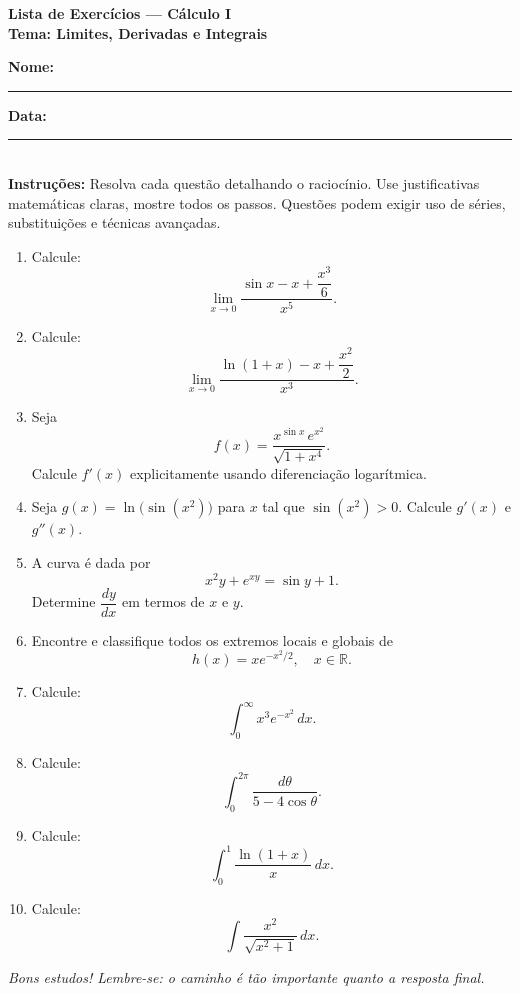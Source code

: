 \documentclass[12pt,a4paper]{article}
\begin{document}
	
	\begin{center}
		\textbf{\LARGE Lista de Exercícios — Cálculo I} \\[0.5cm]
		\textbf{Tema: Limites, Derivadas e Integrais} \\[1cm]
	\end{center}
	
	\noindent
	\textbf{Nome:} \rule{10cm}{0.4pt} \hfill
	
	\noindent
	\textbf{Data:} \rule{4cm}{0.4pt} \\[0.4cm]
	
	\noindent
	\textbf{Instruções:} Resolva cada questão detalhando o raciocínio.  
	Use justificativas matemáticas claras, mostre todos os passos.  
	Questões podem exigir uso de séries, substituições e técnicas avançadas.  
	
	\vspace{0.8cm}
	
	\begin{enumerate}[leftmargin=0.8cm,label=\textbf{Questão \arabic*},itemsep=1.6cm]
		
		\item Calcule:
		\[
		\lim_{x\to 0}\frac{\sin x - x + \dfrac{x^3}{6}}{x^5}.
		\]
		
		\item Calcule:
		\[
		\lim_{x\to 0}\frac{\ln(1+x) - x + \dfrac{x^2}{2}}{x^3}.
		\]
		
		\item Seja
		\[
		f(x)=\frac{x^{\sin x}\,e^{x^2}}{\sqrt{1+x^4}}.
		\]
		Calcule \(f'(x)\) explicitamente usando diferenciação logarítmica.
		
		\item Seja \(g(x)=\ln\big(\sin(x^2)\big)\) para \(x\) tal que \(\sin(x^2)>0\).  
		Calcule \(g'(x)\) e \(g''(x)\).
		
		\item A curva é dada por
		\[
		x^2 y + e^{xy} = \sin y + 1.
		\]
		Determine \(\dfrac{dy}{dx}\) em termos de \(x\) e \(y\).
		
		\item Encontre e classifique todos os extremos locais e globais de
		\[
		h(x)=x e^{-x^2/2},\quad x\in\mathbb{R}.
		\]
		
		\item Calcule:
		\[
		\int_{0}^{\infty} x^3 e^{-x^2}\,dx.
		\]
		
		\item Calcule:
		\[
		\int_{0}^{2\pi}\frac{d\theta}{5-4\cos\theta}.
		\]
		
		
		\item Calcule:
		\[
		\int_{0}^{1}\frac{\ln(1+x)}{x}\,dx.
		\]
		
		
		\item Calcule:
		\[
		\int \frac{x^2}{\sqrt{x^2+1}}\,dx.
		\]
		
	\end{enumerate}
	
	
	\vfill
	\begin{center}
		\textit{Bons estudos! Lembre-se: o caminho é tão importante quanto a resposta final.}
	\end{center}
	
\end{document}
